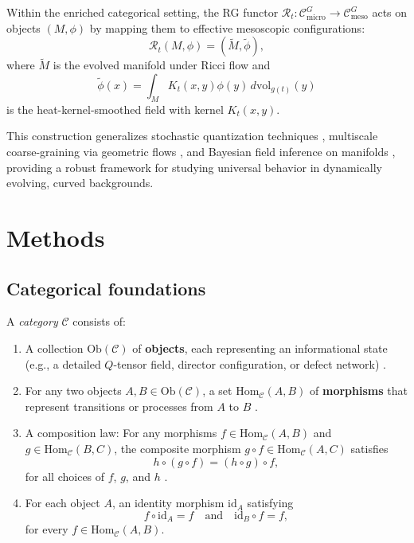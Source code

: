 	Within the enriched categorical setting, the RG functor $
	\mathcal{R}_t: \mathcal{C}_{\mathrm{micro}}^G \to \mathcal{C}_{\mathrm{meso}}^G $ acts on objects $(M, \phi)$ by mapping them to effective mesoscopic configurations:
	\[
	\mathcal{R}_t(M, \phi) = (\widetilde{M}, \widetilde{\phi}),
	\]
	where $\widetilde{M}$ is the evolved manifold under Ricci flow and
	\[
	\widetilde{\phi}(x) = \int_M K_t(x,y) \phi(y) \, d\mathrm{vol}_{g(t)}(y)
	\]
	is the heat-kernel-smoothed field with kernel $K_t(x,y)$.
	
	This construction generalizes stochastic quantization techniques \cite{damgaard1987stochastic}, multiscale coarse-graining via geometric flows \cite{e2003multiscale}, and Bayesian field inference on manifolds \cite{cotter2013bayesian}, providing a robust framework for studying universal behavior in dynamically evolving, curved backgrounds.
	
	\section{Methods}
	
	\subsection{Categorical foundations}
	
	A \emph{category} \(\mathcal{C}\) consists of:
	\begin{enumerate}[label=(\roman*)]
		\item A collection \(\mathrm{Ob}(\mathcal{C})\) of \textbf{objects}, each representing an informational state (e.g., a detailed \(Q\)-tensor field, director configuration, or defect network) \cite{maclane1971categories, spivak2014category}.
		\item For any two objects \(A,B \in \mathrm{Ob}(\mathcal{C})\), a set \(\mathrm{Hom}_{\mathcal{C}}(A,B)\) of \textbf{morphisms} that represent transitions or processes from \(A\) to \(B\) \cite{maclane1971categories}.
		\item A composition law: For any morphisms \(f \in \mathrm{Hom}_{\mathcal{C}}(A,B)\) and \(g \in \mathrm{Hom}_{\mathcal{C}}(B,C)\), the composite morphism \(g\circ f \in \mathrm{Hom}_{\mathcal{C}}(A,C)\) satisfies
		\[
		h\circ (g\circ f) = (h\circ g)\circ f,
		\]
		for all choices of \(f\), \(g\), and \(h\) \cite{maclane1971categories}.
		\item For each object \(A\), an identity morphism \(\mathrm{id}_A\) satisfying
		\[
		f\circ \mathrm{id}_A = f \quad \text{and} \quad \mathrm{id}_B\circ f = f,
		\]
		for every \(f \in \mathrm{Hom}_{\mathcal{C}}(A,B)\).
	\end{enumerate}
	
